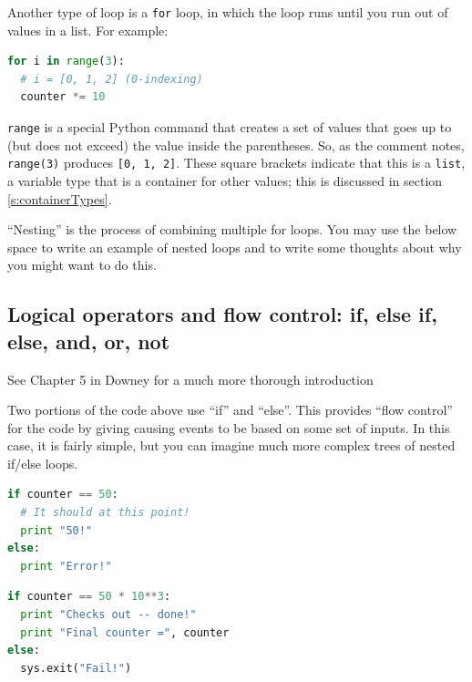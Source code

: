 \documentclass[a4paper,10pt]{scrartcl}
\begin{document}
Another type of loop is a \lstinline{for} loop, in which the loop runs until you run out of values in a list. For example:
\begin{lstlisting}[belowskip=-1.6\baselineskip, language=python]
for i in range(3):
  # i = [0, 1, 2] (0-indexing)
  counter *= 10
\end{lstlisting}
\lstinline{range} is a special Python command that creates a set of values that goes up to (but does not exceed) the value inside the parentheses. So, as the comment notes, \lstinline{range(3)} produces \lstinline{[0, 1, 2]}. These square brackets indicate that this is a \lstinline{list}, a variable type that is a container for other values; this is discussed in section \ref{s:containerTypes}.

``Nesting'' is the process of combining multiple for loops. You may use the below space to write an example of nested loops and to write some thoughts about why you might want to do this.

\vspace{6cm}

\subsection{Logical operators and flow control: if, else if, else, and, or, not}

\begin{framed}
 See Chapter 5 in Downey for a much more thorough introduction
\end{framed}

Two portions of the code above use ``if'' and ``else''. This provides ``flow control'' for the code by giving causing events to be based on some set of inputs. In this case, it is fairly simple, but you can imagine much more complex trees of nested if/else loops.

\begin{lstlisting}[belowskip=-1.6\baselineskip, language=python]
if counter == 50:
  # It should at this point!
  print "50!"
else:
  print "Error!"
\end{lstlisting}
  
\begin{lstlisting}[belowskip=-1.6\baselineskip, language=python]
if counter == 50 * 10**3:
  print "Checks out -- done!"
  print "Final counter =", counter
else:
  sys.exit("Fail!")
\end{lstlisting}
\end{document}
